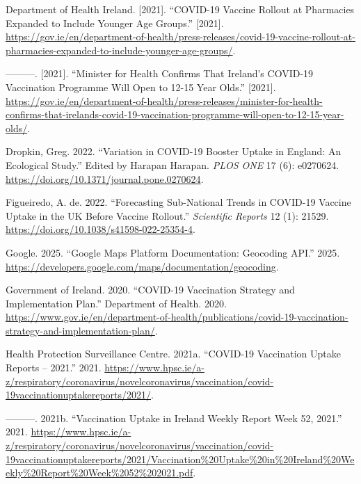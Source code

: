 \documentclass{article}
\newlength{\cslhangindent}
\newenvironment{CSLReferences}[2] %
 {\begin{list}{}{%
  \setlength{\itemindent}{0pt}
  \setlength{\leftmargin}{0pt}
  \setlength{\parsep}{0pt}
  \ifodd #1
   \setlength{\leftmargin}{\cslhangindent}
   \setlength{\itemindent}{-1\cslhangindent}
  \fi
  \setlength{\itemsep}{#2\baselineskip}}}
 {\end{list}}
\begin{document}
\begin{CSLReferences}{1}{0}
Department of Health Ireland. {[}2021{]}. {``{COVID}-19 {Vaccine}
Rollout at Pharmacies Expanded to Include Younger Age Groups.''}
{[}2021{]}.
\url{https://gov.ie/en/department-of-health/press-releases/covid-19-vaccine-rollout-at-pharmacies-expanded-to-include-younger-age-groups/}.

---------. {[}2021{]}. {``Minister for {Health} Confirms That
{Ireland}'s {COVID}-19 {Vaccination} {Programme} Will Open to 12-15 Year
Olds.''} {[}2021{]}.
\url{https://gov.ie/en/department-of-health/press-releases/minister-for-health-confirms-that-irelands-covid-19-vaccination-programme-will-open-to-12-15-year-olds/}.

Dropkin, Greg. 2022. {``Variation in {COVID}-19 Booster Uptake in
{England}: {An} Ecological Study.''} Edited by Harapan Harapan.
\emph{PLOS ONE} 17 (6): e0270624.
\url{https://doi.org/10.1371/journal.pone.0270624}.

Figueiredo, A. de. 2022. {``Forecasting Sub-National Trends in COVID-19
Vaccine Uptake in the UK Before Vaccine Rollout.''} \emph{Scientific
Reports} 12 (1): 21529.
\url{https://doi.org/10.1038/s41598-022-25354-4}.

Google. 2025. {``Google {Maps} {Platform} {Documentation}: {Geocoding}
{API}.''} 2025.
\url{https://developers.google.com/maps/documentation/geocoding}.

Government of Ireland. 2020. {``{COVID-19} Vaccination Strategy and
Implementation Plan.''} Department of Health. 2020.
\url{https://www.gov.ie/en/department-of-health/publications/covid-19-vaccination-strategy-and-implementation-plan/}.

Health Protection Surveillance Centre. 2021a. {``{COVID-19} Vaccination
Uptake Reports -- 2021.''} 2021.
\url{https://www.hpsc.ie/a-z/respiratory/coronavirus/novelcoronavirus/vaccination/covid-19vaccinationuptakereports/2021/}.

---------. 2021b. {``Vaccination Uptake in {Ireland} Weekly Report Week
52, 2021.''} 2021.
\url{https://www.hpsc.ie/a-z/respiratory/coronavirus/novelcoronavirus/vaccination/covid-19vaccinationuptakereports/2021/Vaccination\%20Uptake\%20in\%20Ireland\%20Weekly\%20Report\%20Week\%2052\%202021.pdf}.


\end{CSLReferences}
\end{document}
